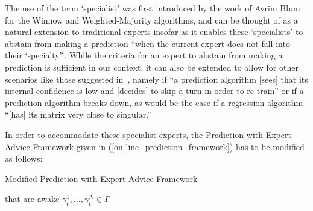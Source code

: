 The use of the term `specialist' was first introduced by the work of Avrim Blum~\cite{blum:1997} for the Winnow and Weighted-Majority algorithms, and can be thought of as a natural extension to traditional experts insofar as it enables these `specialists' to abstain from making a prediction ``when the current expert does not fall into their `specialty'\''. While the criteria for an expert to abstain from making a prediction is sufficient in our context, it can also be extended to allow for other scenarios like those suggested in~\cite{kalnishkan:2022}, namely if ``a prediction algorithm [sees] that its internal confidence is low and [decides] to skip a turn in order to re-train'' or if a prediction algorithm breaks down, as would be the case if a regression algorithm ``[has] its matrix very close to singular.''

In order to accommodate these specialist experts, the Prediction with Expert Advice Framework given in (\ref{on-line_prediction_framework}) has to be modified as follows:
\begin{protocol}[H]
    \caption{Modified Prediction with Expert Advice Framework}\label{modified_prediction_with_expert_advice}
    \begin{algorithmic}[1]
         that are awake
        $\gamma^1_t, \ldots, \gamma^N_t \in \Gamma$
    \end{algorithmic}
\end{protocol}


